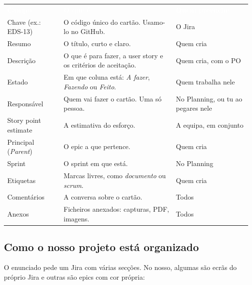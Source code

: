\documentclass[11pt,a4paper]{article}
\newcommand{\th}[1]{\textcolor{white}{\sffamily\bfseries #1}}
\newcommand{\tabelaini}{\begingroup\small\renewcommand{\arraystretch}{1.45}\rowcolors{2}{azulclaro!55}{white}}
\newcommand{\tabelafim}{\endgroup}
\begin{document}
\tabelaini
\begin{tabularx}{\textwidth}{N{3.3cm} Y L{3.3cm}}
   \th{Campo} & \th{O que é} & \th{Quem preenche} \\
  Chave (ex.: EDS-13) & O código único do cartão. Usamo-lo no GitHub. & O Jira \\
  Resumo & O título, curto e claro. & Quem cria \\
  Descrição & O que é para fazer, a user story e os critérios de aceitação. & Quem cria, com o PO \\
  Estado & Em que coluna está: \textit{A fazer}, \textit{Fazendo} ou \textit{Feito}. & Quem trabalha nele \\
  Responsável & Quem vai fazer o cartão. Uma só pessoa. & No Planning, ou tu ao pegares nele \\
  Story point estimate & A estimativa do esforço. & A equipa, em conjunto \\
  Principal (\textit{Parent}) & O epic a que pertence. & Quem cria \\
  Sprint & O sprint em que está. & No Planning \\
  Etiquetas & Marcas livres, como \textit{documento} ou \textit{scrum}. & Quem cria \\
  Comentários & A conversa sobre o cartão. & Todos \\
  Anexos & Ficheiros anexados: capturas, PDF, imagens. & Todos \\
  \bottomrule
\end{tabularx}
\tabelafim

\subsection{Como o nosso projeto está organizado}

O enunciado pede um Jira com várias secções. No nosso, algumas são ecrãs do próprio Jira e outras são epics com cor própria:
\end{document}
